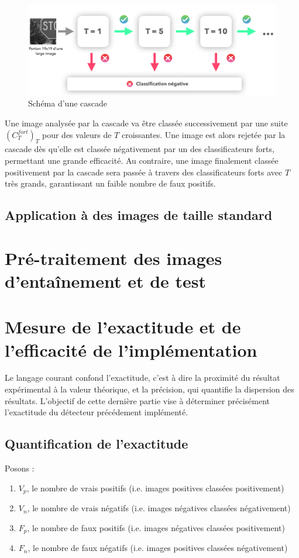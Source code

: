 \documentclass[12pt,a4paper]{article}
\begin{document}
\begin{figure}[t]
    \includegraphics[scale = 0.5]{cascade}
    \centering
    \caption{Schéma d'une cascade}
\end{figure}

Une image analysée par la cascade va être classée successivement par une suite $(C_T^{fort})_T$ pour des valeurs de $T$ croissantes. Une image est alors rejetée par la cascade dès qu'elle est classée négativement par un des classificateurs forts, permettant une grande efficacité. Au contraire, une image finalement classée positivement par la cascade sera passée à travers des classificateurs forts avec $T$ très grands, garantissant un faible nombre de faux positifs.

\subsection{Application à des images de taille standard}
\label{sec:taille_standard}



\section{Pré-traitement des images d'entaînement et de test}
\label{sec:pre-traitement}

\section{Mesure de l'exactitude et de l'efficacité de l'implémentation}
Le langage courant confond l'exactitude, c'est à dire la proximité du résultat expérimental à la valeur théorique, et la précision, qui quantifie la dispersion des résultats. L'objectif de cette dernière partie vise à déterminer précisément l'exactitude du détecteur précédement implémenté.

\subsection{Quantification de l'exactitude}
Posons :
\begin{enumerate}
    \item $V_p$, le nombre de vrais positifs (i.e. images positives classées positivement)
    \item $V_n$, le nombre de vrais négatifs (i.e. images négatives classées négativement)
    \item $F_p$, le nombre de faux positifs (i.e. images négatives classées positivement)
    \item $F_n$, le nombre de faux négatifs (i.e. images positives classées négativement)
\end{enumerate}
\end{document}
